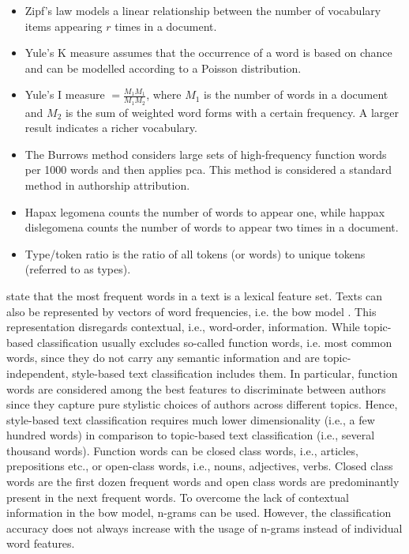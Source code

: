 \begin{itemize}
    \item Zipf's law models a linear relationship between the number of vocabulary items appearing $r$ times in a document.
    \item Yule's K measure assumes that the occurrence of a word is based on chance and can be modelled according to a Poisson distribution.
    \item Yule's I measure $= \frac{M_1 M_1}{M_1 M_2}$, where $M_1$ is the number of words in a document and $M_2$ is the sum of weighted word forms with a certain frequency. A larger result indicates a richer vocabulary.
    \item The Burrows method considers large sets of high-frequency function words per 1000 words and then applies \ac{pca}. This method is considered a standard method in authorship attribution.
    \item Hapax legomena counts the number of words to appear one, while happax dislegomena counts the number of words to appear two times in a document.
    \item Type/token ratio is the ratio of all tokens (or words) to unique tokens (referred to as types).
\end{itemize}
\citet{elmanarelbouanani_authorship_2014} state that the most frequent words in a text is a lexical feature set.
Texts can also be represented by vectors of word frequencies, i.e. the \ac{bow} model \cite{bevendorff_overview_2024}.
This representation disregards contextual, i.e., word-order, information.
While topic-based classification usually excludes so-called function words, 
i.e. most common words, since they do not carry any semantic information and are topic-independent, 
style-based text classification includes them.
In particular, function words are considered among the best features to discriminate between authors 
since they capture pure stylistic choices of authors across different topics.
Hence, style-based text classification requires much lower dimensionality (i.e., a few hundred words) 
in comparison to topic-based text classification (i.e., several thousand words).
Function words can be closed class words, i.e., articles, prepositions etc., 
or open-class words, i.e., nouns, adjectives, verbs.
Closed class words are the first dozen frequent words and 
open class words are predominantly present in the next frequent words.
To overcome the lack of contextual information in the \ac{bow} model, 
n-grams can be used.
However, the classification accuracy does not always increase with the usage of n-grams instead of individual word features.
